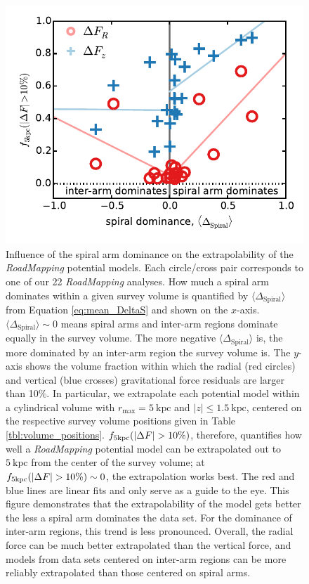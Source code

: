 \documentclass[iop,revtex4,numberedappendix,appendixfloats]{emulateapj}
\newcommand{\RM}{{\sl RoadMapping}}
\begin{document}
\begin{figure}[!htbp]
\centering
\includegraphics[width=\columnwidth]{fig/MNdHHdiffSph2_plot_meankappa_vs_frac10grid_7.pdf}
\caption{Influence of the spiral arm dominance on the extrapolability of the \RM{} potential models. Each circle/cross pair corresponds to one of our 22 \RM{} analyses. How much a spiral arm dominates within a given survey volume is quantified by $\langle \Delta_\text{Spiral} \rangle$ from Equation \eqref{eq:mean_DeltaS} and shown on the $x$-axis. $\langle \Delta_\text{Spiral} \rangle\sim0$ means spiral arms and inter-arm regions dominate equally in the survey volume. The more negative $\langle \Delta_\text{Spiral} \rangle$ is, the more dominated by an inter-arm region the survey volume is. The $y$-axis shows the volume fraction within which the radial (red circles) and vertical (blue crosses) gravitational force residuals are larger than 10\%. In particular, we extrapolate each potential model within a cylindrical volume with $r_\text{max}=5~\text{kpc}$ and $|z| \leq 1.5~\text{kpc}$, centered on the respective survey volume positions given in Table \ref{tbl:volume_positions}. $f_\text{\rm 5kpc}(|\Delta F| > 10\%)$, therefore, quantifies how well a \RM{} potential model can be extrapolated out to $5~\text{kpc}$ from the center of the survey volume; at $f_\text{\rm 5kpc}(|\Delta F| > 10\%) \sim 0$, the extrapolation works best. The red and blue lines are linear fits and only serve as a guide to the eye. This figure demonstrates that the extrapolability of the model gets better the less a spiral arm dominates the data set. For the dominance of inter-arm regions, this trend is less pronounced. Overall, the radial force can be much better extrapolated than the vertical force, and models from data sets centered on inter-arm regions can be more reliably extrapolated than those centered on spiral arms.}
\label{fig:mean_DeltaS_vs_frac10_grid}
\end{figure}
\end{document}
